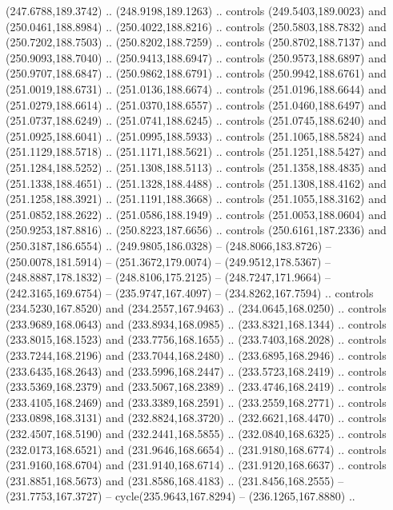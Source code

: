 \begin{scope}[cm={{1.25,0.0,0.0,-1.25,(0.0,442.91375)}}]
    (247.6788,189.3742) .. (248.9198,189.1263) .. controls (249.5403,189.0023) and
    (250.0461,188.8984) .. (250.4022,188.8216) .. controls (250.5803,188.7832) and
    (250.7202,188.7503) .. (250.8202,188.7259) .. controls (250.8702,188.7137) and
    (250.9093,188.7040) .. (250.9413,188.6947) .. controls (250.9573,188.6897) and
    (250.9707,188.6847) .. (250.9862,188.6791) .. controls (250.9942,188.6761) and
    (251.0019,188.6731) .. (251.0136,188.6674) .. controls (251.0196,188.6644) and
    (251.0279,188.6614) .. (251.0370,188.6557) .. controls (251.0460,188.6497) and
    (251.0737,188.6249) .. (251.0741,188.6245) .. controls (251.0745,188.6240) and
    (251.0925,188.6041) .. (251.0995,188.5933) .. controls (251.1065,188.5824) and
    (251.1129,188.5718) .. (251.1171,188.5621) .. controls (251.1251,188.5427) and
    (251.1284,188.5252) .. (251.1308,188.5113) .. controls (251.1358,188.4835) and
    (251.1338,188.4651) .. (251.1328,188.4488) .. controls (251.1308,188.4162) and
    (251.1258,188.3921) .. (251.1191,188.3668) .. controls (251.1055,188.3162) and
    (251.0852,188.2622) .. (251.0586,188.1949) .. controls (251.0053,188.0604) and
    (250.9253,187.8816) .. (250.8223,187.6656) .. controls (250.6161,187.2336) and
    (250.3187,186.6554) .. (249.9805,186.0328) -- (248.8066,183.8726) --
    (250.0078,181.5914) -- (251.3672,179.0074) -- (249.9512,178.5367) --
    (248.8887,178.1832) -- (248.8106,175.2125) -- (248.7247,171.9664) --
    (242.3165,169.6754) -- (235.9747,167.4097) -- (234.8262,167.7594) .. controls
    (234.5230,167.8520) and (234.2557,167.9463) .. (234.0645,168.0250) .. controls
    (233.9689,168.0643) and (233.8934,168.0985) .. (233.8321,168.1344) .. controls
    (233.8015,168.1523) and (233.7756,168.1655) .. (233.7403,168.2028) .. controls
    (233.7244,168.2196) and (233.7044,168.2480) .. (233.6895,168.2946) .. controls
    (233.6435,168.2643) and (233.5996,168.2447) .. (233.5723,168.2419) .. controls
    (233.5369,168.2379) and (233.5067,168.2389) .. (233.4746,168.2419) .. controls
    (233.4105,168.2469) and (233.3389,168.2591) .. (233.2559,168.2771) .. controls
    (233.0898,168.3131) and (232.8824,168.3720) .. (232.6621,168.4470) .. controls
    (232.4507,168.5190) and (232.2441,168.5855) .. (232.0840,168.6325) .. controls
    (232.0173,168.6521) and (231.9646,168.6654) .. (231.9180,168.6774) .. controls
    (231.9160,168.6704) and (231.9140,168.6714) .. (231.9120,168.6637) .. controls
    (231.8851,168.5673) and (231.8586,168.4183) .. (231.8456,168.2555) --
    (231.7753,167.3727) -- cycle(235.9643,167.8294) -- (236.1265,167.8880) ..

\end{scope}
